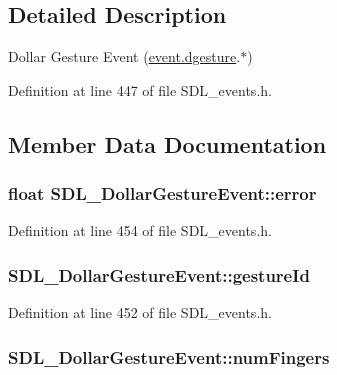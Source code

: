 \subsection{Detailed Description}
Dollar Gesture Event (\hyperlink{union_s_d_l___event_a4481167b9f8549aeb254e97ca812e74d}{event.\-dgesture}.$\ast$) 

Definition at line 447 of file S\-D\-L\-\_\-events.\-h.



\subsection{Member Data Documentation}
\hypertarget{struct_s_d_l___dollar_gesture_event_a30aaa8fe0df93615e6692aa20e9c13eb}{
\subsubsection[{error}]{\setlength{\rightskip}{0pt plus 5cm}float S\-D\-L\-\_\-\-Dollar\-Gesture\-Event\-::error}}\label{struct_s_d_l___dollar_gesture_event_a30aaa8fe0df93615e6692aa20e9c13eb}


Definition at line 454 of file S\-D\-L\-\_\-events.\-h.

\hypertarget{struct_s_d_l___dollar_gesture_event_a68968438eae9e58208b14e8c954dec31}{
\subsubsection[{gesture\-Id}]{ S\-D\-L\-\_\-\-Dollar\-Gesture\-Event\-::gesture\-Id}}\label{struct_s_d_l___dollar_gesture_event_a68968438eae9e58208b14e8c954dec31}


Definition at line 452 of file S\-D\-L\-\_\-events.\-h.

\hypertarget{struct_s_d_l___dollar_gesture_event_a14160d8bad8569f53dd18ed8f64d253f}{
\subsubsection[{num\-Fingers}]{ S\-D\-L\-\_\-\-Dollar\-Gesture\-Event\-::num\-Fingers}}\label{struct_s_d_l___dollar_gesture_event_a14160d8bad8569f53dd18ed8f64d253f}


